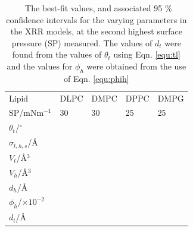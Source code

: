 \documentclass[11pt,a4paper]{paper}
\begin{document}
%
\begin{table}
  \centering
	\caption{\ The best-fit values, and associated 95 \% confidence intervals for the varying parameters in the XRR models, at the second highest surface pressure (SP) measured. The values of $d_t$ were found from the values of $\theta_t$ using Eqn. \ref{equ:tl} and the values for $\phi_h$ were obtained from the use of Eqn. \ref{equ:phih}}
	\label{tab:liptab1}
	\begin{tabular}{l|l|l|l|l}
		Lipid & DLPC & DMPC & DPPC & DMPG \\
    SP/mNm$^{-1}$ & 30 & 30 & 25 & 25 \\
		\hline
		$\theta_t$/$^\circ$ &  &  &  &  \\
		$\sigma_{t,h,s}$/\AA &  &  &  &  \\
    \hline
    $V_t$/\AA$^3$ &  &  &  &  \\
		$V_h$/\AA$^3$ &  &  &  &  \\
		$d_h$/\AA &  &  &  &  \\
    \hline
    $\phi_h$/$\times10^{-2}$ &  &  &  &  \\
		$d_t$/\AA &  &  &  &  \\
	\end{tabular}
\end{table}
%
%
\end{document}
